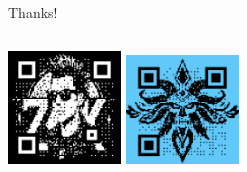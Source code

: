 \documentclass{beamer}
\begin{document}
\begin{frame}
	\centering \Large{Thanks!}
	
	\begin{columns}
	\centering
	\includegraphics[width=3cm]{zkpunk-qrcode.png}
    \centering
    \includegraphics[width=3cm]{lazarus-repo.png}
 \end{columns}
\end{frame}
\end{document}
